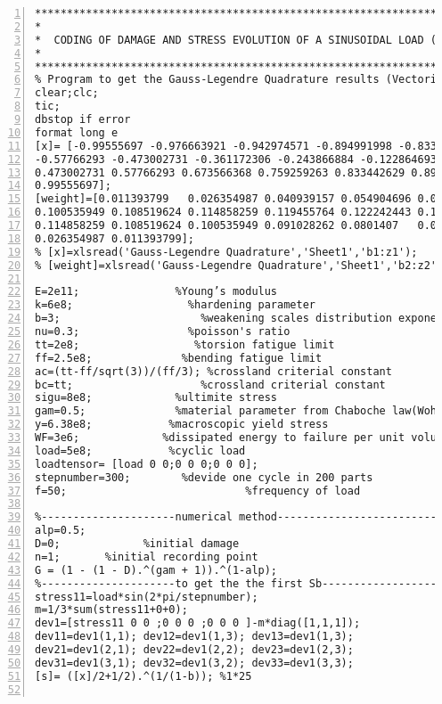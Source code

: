 \clearpage
\begin{lstlisting}[numbers=left, numberstyle=\tiny, keywordstyle=\color{blue!100}, commentstyle=\color{red!30!green!100!blue!100}, frame=shadowbox, rulesepcolor=\color{red!20!green!20!blue!20}]
***********************************************************************
*
*  CODING OF DAMAGE AND STRESS EVOLUTION OF A SINUSOIDAL LOAD (3 METHODS)
*               
***********************************************************************
% Program to get the Gauss-Legendre Quadrature results (Vectorized)
clear;clc;
tic;
dbstop if error
format long e
[x]= [-0.99555697 -0.976663921 -0.942974571 -0.894991998 -0.833442629 -0.759259263 -0.673566368...
-0.57766293 -0.473002731 -0.361172306 -0.243866884 -0.122864693 0 0.122864693 0.243866884 0.361172306...
0.473002731 0.57766293 0.673566368 0.759259263 0.833442629 0.894991998 0.942974571 0.976663921...
0.99555697];
[weight]=[0.011393799	0.026354987	0.040939157	0.054904696	0.068038334	0.0801407	0.091028262...
0.100535949	0.108519624	0.114858259	0.119455764	0.122242443	0.123176054	0.122242443	0.119455764...
0.114858259	0.108519624	0.100535949	0.091028262	0.0801407	0.068038334	0.054904696	0.040939157...
0.026354987	0.011393799];
% [x]=xlsread('Gauss-Legendre Quadrature','Sheet1','b1:z1');
% [weight]=xlsread('Gauss-Legendre Quadrature','Sheet1','b2:z2');

E=2e11;               %Young’s modulus
k=6e8;                  %hardening parameter
b=3;                      %weakening scales distribution exponent
nu=0.3;                 %poisson's ratio
tt=2e8;                  %torsion fatigue limit
ff=2.5e8;              %bending fatigue limit
ac=(tt-ff/sqrt(3))/(ff/3); %crossland criterial constant
bc=tt;                    %crossland criterial constant 
sigu=8e8;             %ultimite stress
gam=0.5;              %material parameter from Chaboche law(Wohler curve exponent)
y=6.38e8;            %macroscopic yield stress
WF=3e6;             %dissipated energy to failure per unit volume
load=5e8;            %cyclic load
loadtensor= [load 0 0;0 0 0;0 0 0];
stepnumber=300;        %devide one cycle in 200 parts
f=50;                            %frequency of load

%---------------------numerical method-----------------------------
alp=0.5;
D=0;             %initial damage
n=1;       %initial recording point
G = (1 - (1 - D).^(gam + 1)).^(1-alp);
%---------------------to get the the first Sb-----------------------------
stress11=load*sin(2*pi/stepnumber);
m=1/3*sum(stress11+0+0);
dev1=[stress11 0 0 ;0 0 0 ;0 0 0 ]-m*diag([1,1,1]);
dev11=dev1(1,1); dev12=dev1(1,3); dev13=dev1(1,3);
dev21=dev1(2,1); dev22=dev1(2,2); dev23=dev1(2,3);
dev31=dev1(3,1); dev32=dev1(3,2); dev33=dev1(3,3);
[s]= ([x]/2+1/2).^(1/(1-b)); %1*25


\end{lstlisting}
